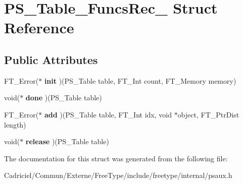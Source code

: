 \hypertarget{struct_p_s___table___funcs_rec__}{\section{P\-S\-\_\-\-Table\-\_\-\-Funcs\-Rec\-\_\- Struct Reference}
\label{struct_p_s___table___funcs_rec__}
}
\subsection*{Public Attributes}
\begin{DoxyCompactItemize}
\item 
\hypertarget{struct_p_s___table___funcs_rec___ad0e795ae1e8a7040b7ef80d4a46e8d6a}{F\-T\-\_\-\-Error($\ast$ {\bfseries init} )(P\-S\-\_\-\-Table table, F\-T\-\_\-\-Int count, F\-T\-\_\-\-Memory memory)}\label{struct_p_s___table___funcs_rec___ad0e795ae1e8a7040b7ef80d4a46e8d6a}

\item 
\hypertarget{struct_p_s___table___funcs_rec___a33d660e1444fbe0ef35a87645f5831ad}{void($\ast$ {\bfseries done} )(P\-S\-\_\-\-Table table)}\label{struct_p_s___table___funcs_rec___a33d660e1444fbe0ef35a87645f5831ad}

\item 
\hypertarget{struct_p_s___table___funcs_rec___a38a0e111e48a877f52cce490362e4c91}{F\-T\-\_\-\-Error($\ast$ {\bfseries add} )(P\-S\-\_\-\-Table table, F\-T\-\_\-\-Int idx, void $\ast$object, F\-T\-\_\-\-Ptr\-Dist length)}\label{struct_p_s___table___funcs_rec___a38a0e111e48a877f52cce490362e4c91}

\item 
\hypertarget{struct_p_s___table___funcs_rec___a252959418225279f78e2ece7fc7705bd}{void($\ast$ {\bfseries release} )(P\-S\-\_\-\-Table table)}\label{struct_p_s___table___funcs_rec___a252959418225279f78e2ece7fc7705bd}

\end{DoxyCompactItemize}


The documentation for this struct was generated from the following file\-:\begin{DoxyCompactItemize}
\item 
Cadriciel/\-Commun/\-Externe/\-Free\-Type/include/freetype/internal/psaux.\-h\end{DoxyCompactItemize}
